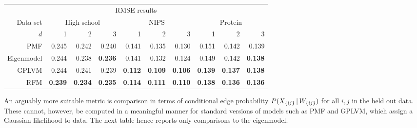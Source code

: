 \begin{center}
  \begin{tabular}{r | r r r | r r r | r r r}
    \multicolumn{10}{c}{RMSE results} \\
    \addlinespace[2pt]
    Data set & \multicolumn{3}{c|}{High school} & \multicolumn{3}{c|}{NIPS} & \multicolumn{3}{c}{Protein} \\
    $d$ & 1 & 2 & 3 & 1 & 2 & 3 & 1 & 2 & 3 \\
    \midrule
    PMF                   & 0.245 & 0.242 & 0.240 & 0.141 & 0.135 & 0.130 & 0.151 & 0.142 & 0.139 \\
    Eigenmodel            & 0.244 & 0.238 & \textbf{0.236} & 0.141 & 0.132 & 0.124 & 0.149 & 0.142 & \textbf{0.138} \\
    GPLVM                 &0.244 & 0.241 & 0.239 & \textbf{0.112} & \textbf{0.109} & \textbf{0.106} & \textbf{0.139} & \textbf{0.137} & \textbf{0.138} \\
    RFM & \textbf{0.239} & \textbf{0.234} & \textbf{0.235} & \textbf{0.114} & \textbf{0.111} & \textbf{0.110} & \textbf{0.138} & \textbf{0.136} & \textbf{0.136}
  \end{tabular}
\end{center}

An arguably more suitable metric is comparison in terms of conditional edge probability \ie ${P(X_{\lbrace ij \rbrace} \,|\, W_{\lbrace ij \rbrace})}$ for all $i,j$ in the held out data. These cannot, however, be computed in a meaningful manner for
standard versions of models such as PMF and GPLVM, which assign a Gaussian likelihood to data. The next table hence reports only comparisons to the eigenmodel.

